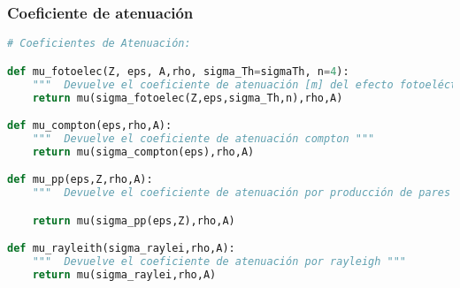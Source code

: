 \subsubsection{Coeficiente de atenuación}
\begin{lstlisting}[language=python]
# Coeficientes de Atenuación: 

def mu_fotoelec(Z, eps, A,rho, sigma_Th=sigmaTh, n=4):
    """  Devuelve el coeficiente de atenuación [m] del efecto fotoeléctrico. """
    return mu(sigma_fotoelec(Z,eps,sigma_Th,n),rho,A)

def mu_compton(eps,rho,A):
    """  Devuelve el coeficiente de atenuación compton """
    return mu(sigma_compton(eps),rho,A)

def mu_pp(eps,Z,rho,A):
    """  Devuelve el coeficiente de atenuación por producción de pares """

    return mu(sigma_pp(eps,Z),rho,A)

def mu_rayleith(sigma_raylei,rho,A):
    """  Devuelve el coeficiente de atenuación por rayleigh """
    return mu(sigma_raylei,rho,A)

\end{lstlisting}